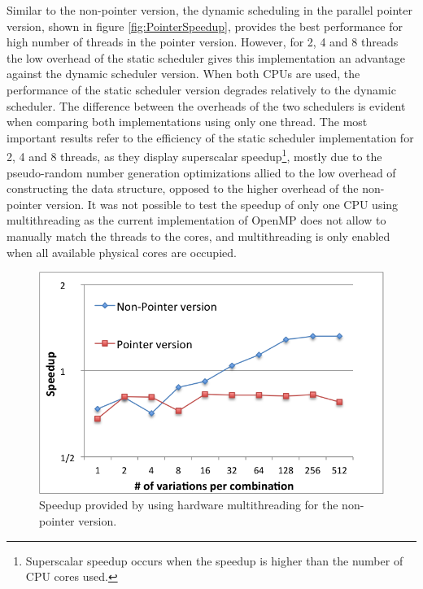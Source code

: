 Similar to the non-pointer version, the dynamic scheduling in the parallel pointer version, shown in figure \ref{fig:PointerSpeedup}, provides the best performance for high number of threads in the pointer version. However, for 2, 4 and 8 threads the low overhead of the static scheduler gives this implementation an advantage against the dynamic scheduler version. When both CPUs are used, the performance of the static scheduler version degrades relatively to the dynamic scheduler. The difference between the overheads of the two schedulers is evident when comparing both implementations using only one thread. The most important results refer to the efficiency of the static scheduler implementation for 2, 4 and 8 threads, as they display superscalar speedup\footnote{Superscalar speedup occurs when the speedup is higher than the number of CPU cores used.}, mostly due to the pseudo-random number generation optimizations allied to the low overhead of constructing the data structure, opposed to the higher overhead of the non-pointer version. It was not possible to test the speedup of only one CPU using multithreading as the current implementation of OpenMP does not allow to manually match the threads to the cores, and multithreading is only enabled when all available physical cores are occupied.

\begin{figure}[!htp]
	\begin{center}
		\includegraphics[scale=0.7]{../../common/graphs/ht_speedup.png}
		\caption{Speedup provided by using hardware multithreading for the non-pointer version.}
		\label{fig:HTSpeedup}
	\end{center}
\end{figure}

